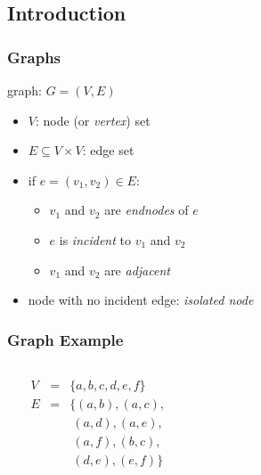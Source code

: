 \documentclass[dvipsnames]{beamer}
\begin{document}
\subsection{Introduction}

\begin{frame}
  \frametitle{Graphs}

  \begin{definition}
    \alert{graph}: $G=(V,E)$

    \begin{itemize}
      \item $V$: \alert{node} (or \emph{vertex}) set
      \item $E \subseteq V \times V$: \alert{edge} set
    \end{itemize}
  \end{definition}

  \pause
  \begin{itemize}
    \item if $e=(v_1,v_2) \in E$:
    \begin{itemize}
      \item $v_1$ and $v_2$ are \emph{endnodes} of $e$
      \item $e$ is \emph{incident} to $v_1$ and $v_2$
      \item $v_1$ and $v_2$ are \emph{adjacent}
    \end{itemize}

    \item node with no incident edge: \emph{isolated node}
  \end{itemize}
\end{frame}

\begin{frame}
  \frametitle{Graph Example}

  \begin{example}
    \begin{columns}
      \begin{center}
      \end{center}

      $\begin{array}{lcl}
        V & = & \{a,b,c,d,e,f\}\\
        E & = & \{(a,b),(a,c),\\
          &   & ~(a,d),(a,e),\\
          &   & ~(a,f),(b,c),\\
          &   & ~(d,e),(e,f)\}
      \end{array}$
    \end{columns}
  \end{example}
\end{frame}
\end{document}
